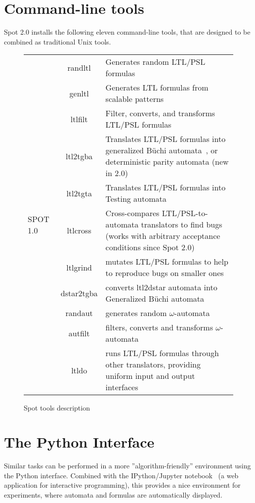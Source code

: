 \section{Command-line tools}
Spot 2.0 installs the following eleven command-line tools, that are designed to be combined as traditional
Unix tools.\\
\begin{figure}[H]
 \begin{tabular}{l c | m{8cm}}
  \multirow{13}{*}{SPOT 1.0~\cite{1}}&randltl&Generates random LTL/PSL formulas\\
   &genltl&Generates LTL formulas from scalable patterns\\
   &ltlfilt&Filter, converts, and transforms LTL/PSL formulas\\
   &ltl2tgba&Translates LTL/PSL formulas into generalized Büchi automata~\cite{7}, or deterministic parity
	     automata (new in 2.0)\\
   &ltl2tgta&Translates LTL/PSL formulas into Testing automata~\cite{6}\\
   &ltlcross&Cross-compares LTL/PSL-to-automata translators to find bugs (works with arbitrary acceptance
	     conditions since Spot 2.0)\\
   \hline
   &ltlgrind&mutates LTL/PSL formulas to help to reproduce bugs on smaller ones\\
   &dstar2tgba&converts ltl2dstar automata into Generalized Büchi automata~\cite{14}\\
   &randaut&generates random $\omega$-automata\\
   &autfilt&filters, converts and transforms $\omega$-automata\\
   &ltldo&runs LTL/PSL formulas through other translators, providing uniform input and output interfaces\\
 \end{tabular}
 \caption{Spot tools description}
\end{figure}

\section{The Python Interface}
Similar tasks can be performed in a more ''algorithm-friendly'' environment using the Python interface.
Combined with the IPython/Jupyter notebook~\cite{4} (a web application for interactive programming), this
provides a nice environment for experiments, where automata and formulas are automatically displayed.


